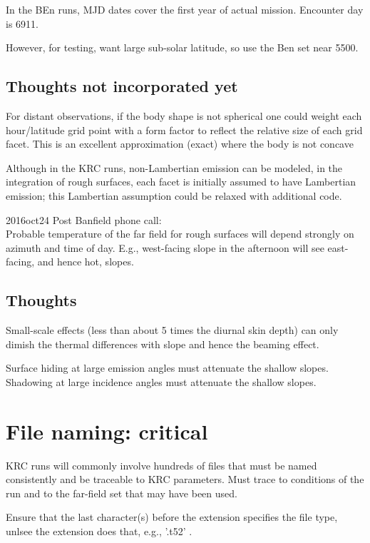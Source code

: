 \documentclass{article}
\begin{document}
In the BEn runs, MJD dates cover the first year of actual mission. Encounter day is 6911.

However, for testing, want large sub-solar latitude,   so use the Ben set near 5500.


\subsection{Thoughts not incorporated yet}

For distant observations, if the body shape is not spherical one could weight
each hour/latitude grid point with a form factor to reflect the relative size of
each grid facet. This is an excellent approximation (exact) where the body is
not concave

Although in the KRC runs, non-Lambertian emission can be modeled, in the
integration of rough surfaces, each facet is initially assumed to have
Lambertian emission; this Lambertian assumption could be relaxed with additional
code.
 
2016oct24 Post Banfield phone call: 
\\ Probable temperature of the far field for rough surfaces will depend strongly
on azimuth and time of day. E.g., west-facing slope in the afternoon will see
east-facing, and hence hot, slopes.
 

\subsection{Thoughts}

 Small-scale effects (less than about 5 times the diurnal skin depth) can only
 dimish the thermal differences with slope and hence the beaming effect.

Surface hiding at large emission angles must attenuate the shallow slopes. 
Shadowing at large incidence angles must attenuate the shallow slopes.


\section{File naming: critical}

 KRC runs will commonly involve hundreds of files that must be named
 consistently and be traceable to KRC parameters.  Must trace to conditions of
 the run and to the far-field set that may have been used. 

Ensure that the last character(s) before the extension specifies the file type,
 unlsee the extension does that, e.g., '.t52' .
\end{document}
